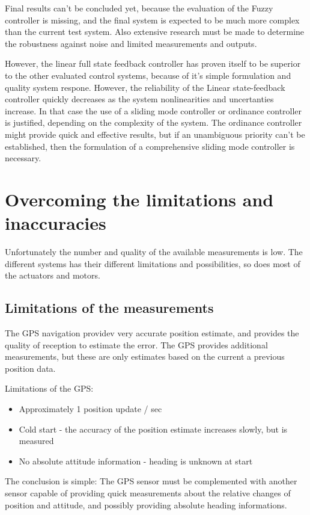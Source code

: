 Final results can’t be concluded yet, because the evaluation of the Fuzzy controller is missing, and the final system is expected to be much more complex than the current test system. Also extensive research must be made to determine the robustness against noise and limited measurements and outputs.

However, the linear full state feedback controller has proven itself to be superior to the other evaluated control systems, because of it’s simple formulation and quality system respone. However, the reliability of the Linear state-feedback controller quickly decreases as the system nonlinearities and uncertanties increase.
In that case the use of a sliding mode controller or ordinance controller is justified, depending on the complexity of the system. The ordinance controller might provide quick and effective results, but if an unambiguous priority can’t be established, then the formulation of a comprehensive sliding mode controller is necessary.

\section{Overcoming the limitations and inaccuracies}

Unfortunately the number and quality of the available measurements is low. The different systems has their different limitations and possibilities, so does most of the actuators and motors.

\subsection{Limitations of the measurements}

The GPS navigation providev very accurate position estimate, and provides the quality of reception to estimate the error. The GPS provides additional measurements, but these are only estimates based on the current a previous position data.

Limitations of the GPS:
\begin{itemize}
\item Approximately 1 position update / sec
\item Cold start - the accuracy of the position estimate increases slowly, but is measured
\item No absolute attitude information - heading is unknown at start
\end{itemize}

The conclusion is simple: The GPS sensor must be complemented with another sensor capable of providing quick measurements about the relative changes of position and attitude, and possibly providing absolute heading informations.

